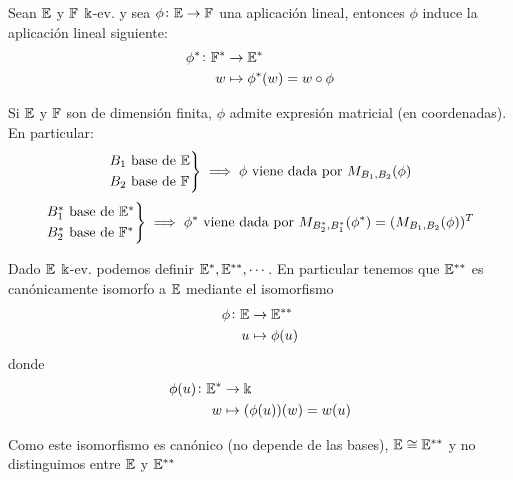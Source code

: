 \begin{prop}
    Sean $\mathbb{E}$ y $\mathbb{F}$ $\Bbbk$-ev. y sea $\phi \colon \mathbb{E} \to \mathbb{F}$ una
    aplicación lineal, entonces $\phi$ induce la aplicación
    lineal siguiente:
    \[
        \begin{aligned}
        \phi^* \colon \mathbb{F}^* &\to \mathbb{E}^*\\
        w &\mapsto \phi^*(w) = w \circ \phi
        \end{aligned}
    \]
\end{prop}
\begin{obs}
    Si $\mathbb{E}$ y $\mathbb{F}$ son de dimensión finita, $\phi$ admite expresión
    matricial (en coordenadas). En particular:
    \[
        \displaystyle \begin{rcases} B_1 \text{ base de } \mathbb{E} \\ B_2
        \text{ base de } \mathbb{F} \end{rcases} \implies \phi \text{ viene dada por }
        M_{B_1,B_2}(\phi)
    \]
    \[
        \displaystyle \begin{rcases} B_1^*
        \text{ base de } \mathbb{E}^* \\ B_2^* \text{ base de } \mathbb{F}^*
        \end{rcases} \implies \phi^* \text{ viene dada por }
        M_{B_2^*,B_1^*}(\phi^*) = (M_{B_1,B_2}(\phi))^T
    \]
\end{obs}
\begin{prop}
    Dado $\mathbb{E}$ $\Bbbk$-ev. podemos definir $\mathbb{E}^*,\mathbb{E}^{**},\cdots$. En
    particular tenemos que $\mathbb{E}^{**}$ es canónicamente isomorfo a
    $\mathbb{E}$ mediante el isomorfismo
    \[
        \begin{aligned}
            \phi \colon \mathbb{E} &\to \mathbb{E}^{**}\\
            u &\mapsto \phi(u)
        \end{aligned}
    \]
    donde
    \[
        \begin{aligned}
            \phi(u) \colon \mathbb{E}^* &\to \Bbbk \\
            w &\mapsto (\phi(u))(w) = w(u)
        \end{aligned}
    \]
\end{prop}
\begin{obs}
    Como este isomorfismo es canónico (no depende de las bases),
    $\mathbb{E} \cong \mathbb{E}^{**}$ y no distinguimos entre $\mathbb{E}$ y $\mathbb{E}^{**}$
\end{obs}



